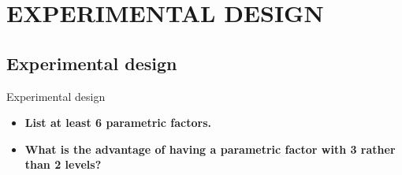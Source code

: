 \documentclass{beamer}
\begin{document}


\section{EXPERIMENTAL DESIGN}


\subsection[Experimental design]{Experimental design}


\begin{frame}{Experimental design}
  \begin{itemize}
    \item \textbf{List at least 6 parametric factors.}


    \bigskip
    \item \textbf{What is the advantage of having a parametric factor with 3 rather than 2 levels?}



  \end{itemize}
\end{frame}




%
\end{document}
